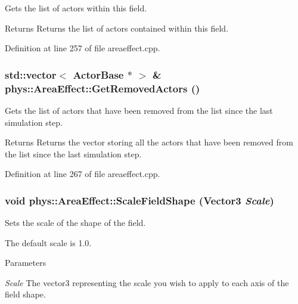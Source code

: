 Gets the list of actors within this field. 

\begin{DoxyReturn}{Returns}
Returns the list of actors contained within this field. 
\end{DoxyReturn}


Definition at line 257 of file areaeffect.cpp.

\hypertarget{classphys_1_1AreaEffect_a021763db69e977a3a19ad7cc39df073b}{
\subsubsection[{GetRemovedActors}]{\setlength{\rightskip}{0pt plus 5cm}std::vector$<$ {\bf ActorBase} $\ast$ $>$ \& phys::AreaEffect::GetRemovedActors ()}}
\label{d4/d55/classphys_1_1AreaEffect_a021763db69e977a3a19ad7cc39df073b}


Gets the list of actors that have been removed from the list since the last simulation step. 

\begin{DoxyReturn}{Returns}
Returns the vector storing all the actors that have been removed from the list since the last simulation step. 
\end{DoxyReturn}


Definition at line 267 of file areaeffect.cpp.

\hypertarget{classphys_1_1AreaEffect_a0f906c38396ded16978423ad9acc4673}{
\subsubsection[{ScaleFieldShape}]{\setlength{\rightskip}{0pt plus 5cm}void phys::AreaEffect::ScaleFieldShape ({\bf Vector3} {\em Scale})}}
\label{d4/d55/classphys_1_1AreaEffect_a0f906c38396ded16978423ad9acc4673}


Sets the scale of the shape of the field. 

The default scale is 1.0. 
\begin{DoxyParams}{Parameters}
\item[{\em Scale}]The vector3 representing the scale you wish to apply to each axis of the field shape. \end{DoxyParams}


